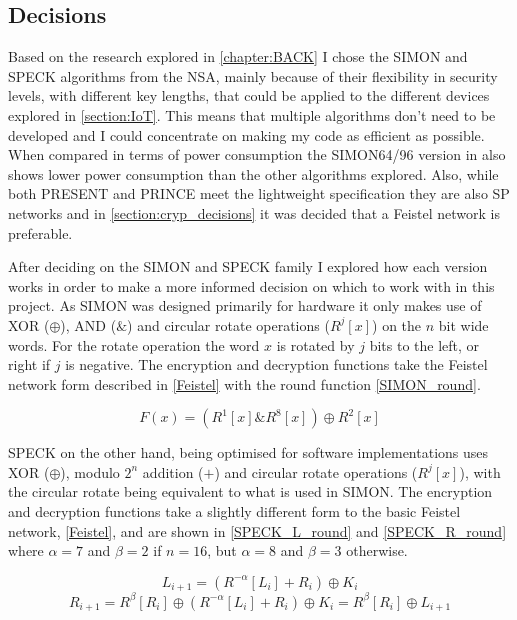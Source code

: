 \documentclass[12pt,twoside,a4paper]{report}
\begin{document}
	\subsection{Decisions}
	Based on the research explored in \autoref{chapter:BACK} I chose the SIMON and SPECK algorithms from the NSA, mainly because of their flexibility in security levels, with different key lengths, that could be applied to the different devices explored in \autoref{section:IoT}. This means that multiple algorithms don't need to be developed and I could concentrate on making my code as efficient as possible. When compared in terms of power consumption the SIMON64/96 version in \cite{Banik2015} also shows lower power consumption than the other algorithms explored. Also, while both PRESENT and PRINCE meet the lightweight specification they are also SP networks and in \autoref{section:cryp_decisions} it was decided that a Feistel network is preferable.
    
	After deciding on the SIMON and SPECK family I explored how each version works in order to make a more informed decision on which to work with in this project. As SIMON was designed primarily for hardware it only makes use of XOR ($\oplus$), AND ($\&$) and circular rotate operations ($R^j[x]$) on the $n$ bit wide words. For the rotate operation the word $x$ is rotated by $j$ bits to the left, or right if $j$ is negative. The encryption and decryption functions take the Feistel network form described in \autoref{Feistel} with the round function \autoref{SIMON_round}.
    
	\begin{equation}
	\label{SIMON_round}
	F(x) = (R^1[x]\&R^8[x]) \oplus R^2[x]
	\end{equation}
    
	SPECK on the other hand, being optimised for software implementations uses XOR ($\oplus$), modulo $2^n$ addition ($+$) and circular rotate operations ($R^j[x]$), with the circular rotate being equivalent to what is used in SIMON. The encryption and decryption functions take a slightly different form to the basic Feistel network, \autoref{Feistel}, and are shown in \autoref{SPECK_L_round} and \ref{SPECK_R_round} where $\alpha = 7$ and $\beta = 2$ if $n = 16$, but $\alpha = 8$ and $\beta = 3$ otherwise.
    
	\begin{equation}
	\label{SPECK_L_round}
	L_{i+1} = (R^{-\alpha}[L_i] + R_i) \oplus K_i
	\end{equation}
	\begin{equation}
	\label{SPECK_R_round}
	R_{i+1} = R^{\beta}[R_i] \oplus (R^{-\alpha}[L_i] + R_i) \oplus K_i = R^{\beta}[R_i] \oplus L_{i+1}
	\end{equation}
	
\end{document}
